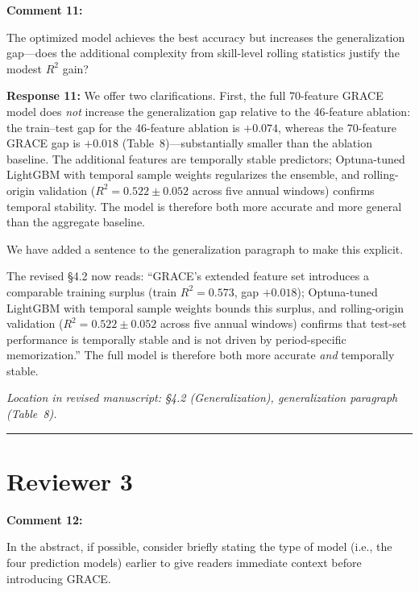 \documentclass[11pt]{article}
\newcommand{\rev}[1]{{\color{ccolor}#1}}
\begin{document}
\textbf{Comment 11:}
\begin{rquote}
The optimized model achieves the best accuracy but increases the generalization
gap---does the additional complexity from skill-level rolling statistics justify the
modest $R^2$ gain?
\end{rquote}

\textbf{Response 11:}
We offer two clarifications. First, the full 70-feature GRACE model does
\emph{not} increase the generalization gap relative to the 46-feature ablation:
the train--test gap for the 46-feature ablation is $+0.074$, whereas the 70-feature
GRACE gap is $+0.018$ (Table~8)---substantially smaller than the ablation baseline. The additional features are temporally stable predictors; Optuna-tuned LightGBM with
temporal sample weights regularizes the ensemble, and rolling-origin validation
($R^{2} = 0.522 \pm 0.052$ across five annual windows) confirms temporal stability.
The model is therefore both more accurate and more general than the aggregate baseline.

We have added a sentence to the generalization paragraph to make this explicit.

\rev{The revised \S4.2 now reads: ``GRACE's extended feature set introduces a comparable
training surplus (train $R^{2} = 0.573$, gap $+0.018$); Optuna-tuned LightGBM with
temporal sample weights bounds this surplus, and rolling-origin validation
($R^{2} = 0.522 \pm 0.052$ across five annual windows) confirms that test-set
performance is temporally stable and is not driven by period-specific memorization.''
The full model is therefore both more accurate \emph{and} temporally stable.}

\textit{Location in revised manuscript: \S4.2 (Generalization), generalization paragraph
(Table~8).}

\bigskip
\hrule

\section*{Reviewer 3}

\bigskip

\textbf{Comment 12:}
\begin{rquote}
In the abstract, if possible, consider briefly stating the type of model (i.e., the
four prediction models) earlier to give readers immediate context before introducing GRACE.
\end{rquote}
\end{document}

